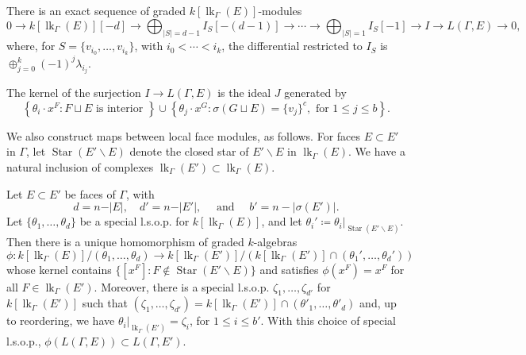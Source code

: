 \documentclass[ALCO, Unicode,published]{cedram}
\DeclareMathOperator{\lk}{lk}
\DeclareMathOperator{\Star}{Star}
\begin{document}
\begin{theorem}\label{thm:resolution}
There is an exact sequence of graded $k[\lk_{\Gamma}(E)]$-modules
 $$0  \to k[\lk_{\Gamma}(E)][-d] \to \bigoplus_{ |S|  = d - 1 } I_{S}[-(d-1)] \to \dotsb  \to \bigoplus_{|S| = 1} I_{S}[-1] \to I \to L(\Gamma,E) \to 0,$$
where,  
for $S= \{v_{i_0}, \ldots, v_{i_k}\}$, with $i_0 < \cdots < i_k$, the differential restricted to $I_S$ is $\oplus_{j = 0}^k (-1)^j \lambda_{i_j}$.
\end{theorem}

\begin{corollary}\label{cor:presentation}
The kernel of the surjection $I \to L(\Gamma, E)$ is the ideal $J$ generated by 
 $$ \left \{ \theta_i \cdot x^{F} : F \sqcup E \mbox{ is interior } \right \}  \cup  \left \{ \theta_{j} \cdot x^G : \sigma(G \sqcup E) = \{v_j\}^c, \mbox{ for } 1 \leq j \leq b \right \}.$$
\end{corollary}

We also construct maps between local face modules, as follows. For faces $E \subset E'$ in $\Gamma$, let $\Star(E' \smallsetminus E)$ denote the closed star of $E' \smallsetminus E$ in $\lk_\Gamma(E)$. 
We have a natural inclusion of complexes 
$\lk_\Gamma(E') \subset \lk_\Gamma(E)$. 




\begin{theorem}\label{thm:maps}
Let $E \subset E'$ be faces of $\Gamma$, with $$d = n - \vert E \vert, \quad  
d' = n - \vert E' \vert, \quad 
\mbox{ and } \quad b' = n - |\sigma(E')|.$$ Let $\{\theta_1, \dotsc, \theta_{d } \}$ be a special l.s.o.p. for $k[\lk_{\Gamma}(E)]$,  
and let 
$\theta_i'  \coloneqq  \theta_i|_{\Star(E' \smallsetminus E)}$.  Then there is a 
unique homomorphism of graded 
$k$-algebras 
\[
\phi\colon k[\lk_{\Gamma}(E)]/(\theta_1, \dotsc, \theta_d) \to k[\lk_{\Gamma}(E')]/(k[\lk_\Gamma(E')]  \cap (\theta_1', \dotsc, \theta_{d}'))
\]
whose kernel contains $\{[x^F] : F \not \in \Star(E' \smallsetminus E)\}$ and satisfies $\phi(x^F) = x^F$ for all $F \in \lk_{\Gamma}(E')$. Moreover, there is a special l.s.o.p. $\zeta_1, \ldots, \zeta_{d'}$ for $k[\lk_\Gamma(E')]$ such that $(\zeta_1, \ldots, \zeta_{d'}) = k[\lk_\Gamma(E')] \cap (\theta'_1, \ldots, \theta'_{d})$ and, up to reordering, we have $\theta_i|_{\lk_\Gamma(E')} = \zeta_i$, for $1 \leq i \leq b'$.  With this choice of special l.s.o.p., $\phi(L(\Gamma,E)) \subset L(\Gamma,E')$. 
\end{theorem}
\end{document}
